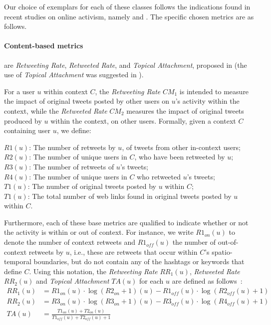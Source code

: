 \documentclass[runningheads]{llncs}
\begin{document}
Our choice of exemplars for each of these classes follows the indications found in recent studies on online activism, namely \cite{Lotan2011} and  \cite{Poell2014}.
The specific chosen metrics are as follows.

\paragraph{Content-based metrics} are \textit{Retweeting Rate}, \textit{Retweeted Rate}, and  \textit{Topical Attachment}, proposed in \cite{Bizid:2015} (the use of \textit{Topical Attachment} was suggested in \cite{Poell2014}).

For a user $u$ within context $C$, the \textit{Retweeting Rate}  $CM_1$ is intended to measure the impact of  original tweets posted  by other users on $u$'s activity within the context, while the \textit{Retweeted Rate} $CM_2$  measures the impact of original tweets produced by $u$ within the context, on other users.
Formally, given a context $C$ containing user $u$, we define:

\noindent 
$R1(u)$: The number of retweets by $u$, of tweets from other in-context users;\\
$R2(u)$: The number of unique users in $C$, who have been retweeted by $u$; \\
$R3(u)$: The number of retweets of $u$'s  tweets; \\
$R4(u)$: The number of unique users in $C$ who retweeted $u$'s tweets; \\
$T1(u)$: The number of original tweets posted by $u$ within $C$; \\
$T1(u)$: The total number of web links found in original tweets posted by $u$ within $C$.

Furthermore, each of these base metrics  are qualified to indicate whether or not the activity is within or out of context.
For instance, we write $R1_{on}(u)$ to denote the number of context retweets and $R1_{off}(u)$ the number of out-of-context retweets by $u$, i.e., these are retweets that occur within $C$'s spatio-temporal boundaries, but do not contain any of the hashtags or keywords that define $C$.  
Using this notation, the \textit{Retweeting Rate} $RR_1(u)$, \textit{Retweeted Rate} $RR_2(u)$ and \textit{Topical Attachment} $TA(u)$ for each $u$ are defined as follows~\cite{Bizid:2015}:
\begin{align}
RR_1(u) & =  R1_{on}(u) \cdot \log(R2_{on}+1)(u) - R1_{off}(u) \cdot \log(R2_{off}(u)+1) \\
RR_2(u) & =  R3_{on}(u) \cdot \log(R3_{on}+1)(u) - R3_{off}(u) \cdot \log(R4_{off}(u)+1) \\
TA(u) & = \frac{T1_{on}(u) + T2_{on}(u)}{T1_{off}(u) + T2_{off}(u) +1} 
\end{align}
\end{document}
